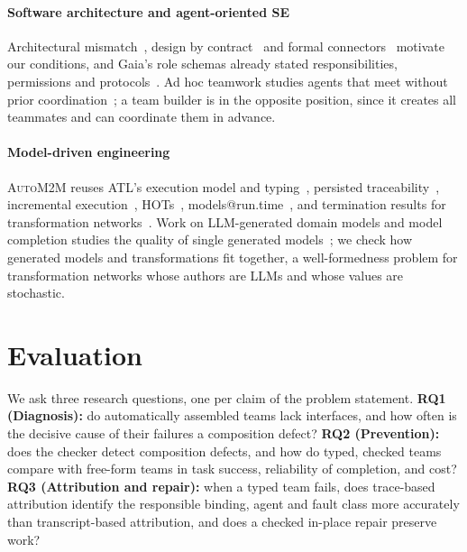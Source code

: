 \documentclass[10pt,conference]{IEEEtran}
\theoremstyle{definition}
\newcommand{\auto}{\textsc{AutoM2M}}
\begin{document}
\paragraph*{Software architecture and agent-oriented SE} Architectural
mismatch~\cite{garlan1995mismatch,garlan2009mismatch}, design by
contract~\cite{meyer1992dbc} and formal connectors~\cite{allen1997connection}
motivate our conditions, and Gaia's role schemas already stated
responsibilities, permissions and protocols~\cite{wooldridge2000gaia}. Ad hoc
teamwork studies agents that meet without prior
coordination~\cite{stone2010adhoc,wang2024oaht}; a team builder is in the
opposite position, since it creates all teammates and can coordinate them in
advance.

\paragraph*{Model-driven engineering} \auto{} reuses ATL's execution model
and typing~\cite{jouault2008atl}, persisted
traceability~\cite{jouault2005traceability,vara2014metagem}, incremental
execution~\cite{jouault2010incremental}, HOTs~\cite{tisi2009hot},
models@run.time~\cite{blair2009runtime}, and termination results for
transformation networks~\cite{stevens2020networks,klare2023termination}. Work
on LLM-generated domain models and model completion studies the quality of
single generated
models~\cite{chen2023domainmodeling,chaaben2023fewshot,clariso2023mdpe}; we
check how generated models and transformations fit together, a
well-formedness problem for transformation networks whose authors are LLMs and
whose values are stochastic.

\section{Evaluation}\label{sec:eval}

We ask three research questions, one per claim of the problem statement.
\textbf{RQ1 (Diagnosis):} do automatically assembled teams lack interfaces,
and how often is the decisive cause of their failures a composition defect?
\textbf{RQ2 (Prevention):} does the checker detect composition defects, and
how do typed, checked teams compare with free-form teams in task success,
reliability of completion, and cost?
\textbf{RQ3 (Attribution and repair):} when a typed team fails, does
trace-based attribution identify the responsible binding, agent and fault
class more accurately than transcript-based attribution, and does a checked
in-place repair preserve work?
\end{document}
